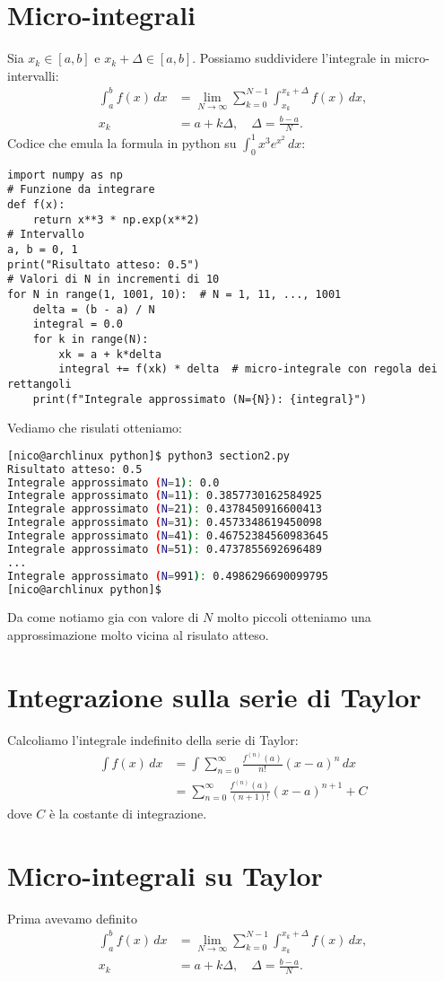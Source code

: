 \documentclass[10pt]{extarticle}
\begin{document}
\section{Micro-integrali}
Sia $x_k \in [a,b]$ e $x_k + \Delta \in [a,b]$. Possiamo suddividere l'integrale in micro-intervalli:
\begin{align*}
    \int_a^b f(x) \, dx &= \lim_{N \to \infty} \sum_{k=0}^{N-1} \int_{x_k}^{x_k + \Delta} f(x) \, dx, \\
    x_k &= a + k \Delta, \quad \Delta = \frac{b-a}{N}.
\end{align*}
Codice che emula la formula in python su $\int_0^1 x^3 e^{x^2} \, dx$:
\begin{lstlisting}
import numpy as np
# Funzione da integrare
def f(x):
    return x**3 * np.exp(x**2)
# Intervallo
a, b = 0, 1
print("Risultato atteso: 0.5")
# Valori di N in incrementi di 10
for N in range(1, 1001, 10):  # N = 1, 11, ..., 1001
    delta = (b - a) / N
    integral = 0.0
    for k in range(N):
        xk = a + k*delta
        integral += f(xk) * delta  # micro-integrale con regola dei rettangoli
    print(f"Integrale approssimato (N={N}): {integral}")
\end{lstlisting}
Vediamo che risulati otteniamo:
\begin{lstlisting}[language=bash]
[nico@archlinux python]$ python3 section2.py
Risultato atteso: 0.5
Integrale approssimato (N=1): 0.0
Integrale approssimato (N=11): 0.3857730162584925
Integrale approssimato (N=21): 0.4378450916600413
Integrale approssimato (N=31): 0.4573348619450098
Integrale approssimato (N=41): 0.46752384560983645
Integrale approssimato (N=51): 0.4737855692696489
...
Integrale approssimato (N=991): 0.4986296690099795
[nico@archlinux python]$
\end{lstlisting}
Da come notiamo gia con valore di $N$ molto piccoli otteniamo una approssimazione molto vicina al risulato atteso.
\section{Integrazione sulla serie di Taylor}
Calcoliamo l'integrale indefinito della serie di Taylor:
\begin{align*}
    \int f(x) \, dx &= \int \sum_{n=0}^{\infty} \frac{f^{(n)}(a)}{n!} (x-a)^n \, dx \\
    &= \sum_{n=0}^{\infty} \frac{f^{(n)}(a)}{(n+1)!} (x-a)^{n+1} + C
\end{align*}
dove \(C\) è la costante di integrazione.
\section{Micro-integrali su Taylor}
Prima avevamo definito
\begin{align*}
    \int_a^b f(x) \, dx &= \lim_{N \to \infty} \sum_{k=0}^{N-1} \int_{x_k}^{x_k + \Delta} f(x) \, dx, \\
    x_k &= a + k \Delta, \quad \Delta = \frac{b-a}{N}.
\end{align*}
\end{document}
